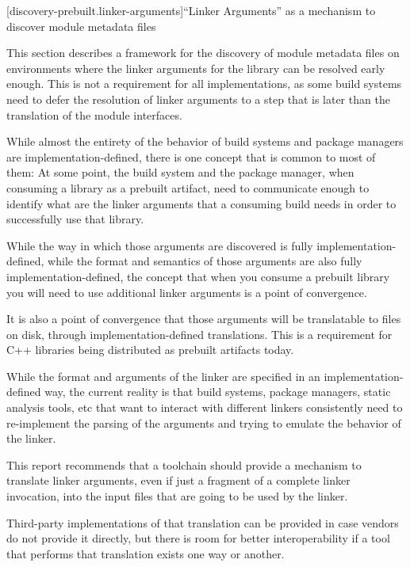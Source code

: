 
[discovery-prebuilt.linker-arguments]{``Linker Arguments'' as a
  mechanism to discover \Cpp{} module metadata files}

\pnum This section describes a framework for the discovery of module
metadata files on environments where the linker arguments for the
library can be resolved early enough. This is not a requirement for
all implementations, as some build systems need to defer the
resolution of linker arguments to a step that is later than the
translation of the module interfaces.

\pnum While almost the entirety of the behavior of build systems and
package managers are implementation-defined, there is one concept
that is common to most of them: At some point, the build system and
the package manager, when consuming a library as a prebuilt artifact,
need to communicate enough to identify what are the linker arguments
that a consuming build needs in order to successfully use that
library.

\pnum While the way in which those arguments are discovered is fully
implementation-defined, while the format and semantics of those
arguments are also fully implementation-defined, the concept that when
you consume a prebuilt library you will need to use additional linker
arguments is a point of convergence.

\pnum It is also a point of convergence that those arguments will be
translatable to files on disk, through implementation-defined
translations. This is a requirement for C++ libraries being
distributed as prebuilt artifacts today.

\pnum While the format and arguments of the linker are specified in an
implementation-defined way, the current reality is that build systems,
package managers, static analysis tools, etc that want to interact
with different linkers consistently need to re-implement the parsing
of the arguments and trying to emulate the behavior of the linker.

\pnum This report recommends that a toolchain should provide a
mechanism to translate linker arguments, even if just a fragment of a
complete linker invocation, into the input files that are going to be
used by the linker.

\pnum Third-party implementations of that translation can be provided
in case vendors do not provide it directly, but there is room for
better interoperability if a tool that performs that translation
exists one way or another.


